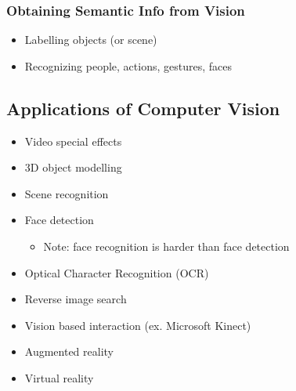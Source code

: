 \documentclass[letterpaper,12pt]{article}
\begin{document}
\subsubsection{Obtaining Semantic Info from Vision}
\begin{itemize}
 \item Labelling objects (or scene)
 \item Recognizing people, actions, gestures, faces
\end{itemize}

\subsection{Applications of Computer Vision}
\begin{itemize}
 \item Video special effects
 \item 3D object modelling
 \item Scene recognition
 \item Face detection
       \begin{itemize}
        \item Note: face recognition is harder than face detection
       \end{itemize}
 \item Optical Character Recognition (OCR)
 \item Reverse image search
 \item Vision based interaction (ex. Microsoft Kinect)
 \item Augmented reality
 \item Virtual reality
\end{itemize}
\end{document}
